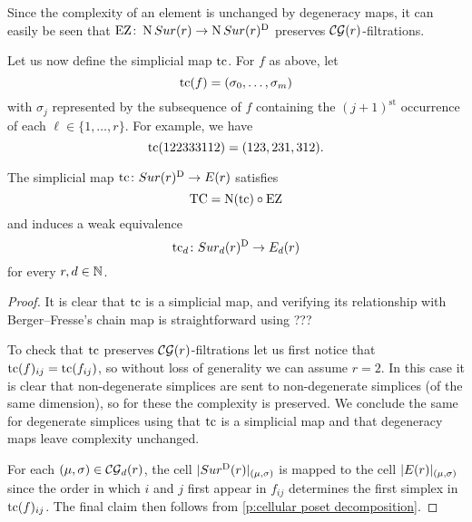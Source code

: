 Since the complexity of an element is unchanged by degeneracy maps, it can easily be seen that $\operatorname{EZ} \colon \operatorname{N}Sur(r) \to \operatorname{N}Sur(r)^{\mathrm{D}}$ preserves $\mathcal{CG}(r)$-filtrations.

Let us now define the simplicial map $\operatorname{tc}$.
For $f$ as above, let
\[
\operatorname{tc}(f) = (\sigma_0,\dots,\sigma_m)
\]
with $\sigma_j$ represented by the subsequence of $f$ containing the $(j+1)^{\mathrm{st}}$ occurrence of each $\ell \in \{1,\dots,r\}$.
For example, we have
\[
\operatorname{tc}(122333112) = (123,231,312).
\]

\begin{theorem}
	The simplicial map $\operatorname{tc} \colon Sur(r)^{\mathrm{D}} \to E(r)$ satisfies
	\[
	\operatorname{TC} = \operatorname{N}(\operatorname{tc}) \circ \operatorname{EZ}
	\]
	and induces a weak equivalence
	\[
	\operatorname{tc}_d \colon Sur_d(r)^{\mathrm{D}} \to E_d(r)
	\]
	for every $r,d \in \mathbb{N}$.
\end{theorem}

\begin{proof}
	It is clear that $\operatorname{tc}$ is a simplicial map, and verifying its relationship with Berger--Fresse's chain map is straightforward using ???

	To check that $\operatorname{tc}$ preserves $\mathcal{CG}(r)$-filtrations let us first notice that $\operatorname{tc}(f)_{ij} = \operatorname{tc}(f_{ij})$, so without loss of generality we can assume $r=2$.
	In this case it is clear that non-degenerate simplices are sent to non-degenerate simplices (of the same dimension), so for these the complexity is preserved.
	We conclude the same for degenerate simplices using that $\operatorname{tc}$ is a simplicial map and that degeneracy maps leave complexity unchanged.

	For each $(\mu,\sigma) \in \mathcal{CG}_d(r)$, the cell $\lvert Sur^{\mathrm{D}}(r)\rvert_{(\mu,\sigma)}$ is mapped to the cell $\lvert E(r)\rvert_{(\mu,\sigma)}$ since the order in which $i$ and $j$ first appear in $f_{ij}$ determines the first simplex in $\operatorname{tc}(f)_{ij}$.
	The final claim then follows from \cref{p:cellular poset decomposition}.
\end{proof}